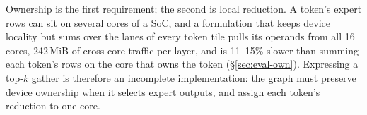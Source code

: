 Ownership is the first requirement; the second is local reduction. A token's expert rows can sit on several cores of a
SoC, and a formulation that keeps device locality but sums over the lanes of every token tile pulls its operands from all
16 cores, 242\,MiB of cross-core traffic per layer, and is 11--15\% slower than summing each token's rows on the core that
owns the token (\S\ref{sec:eval-own}). Expressing a top-$k$ gather is therefore an incomplete implementation: the graph
must preserve device ownership when it selects expert outputs, and assign each token's reduction to one core.
